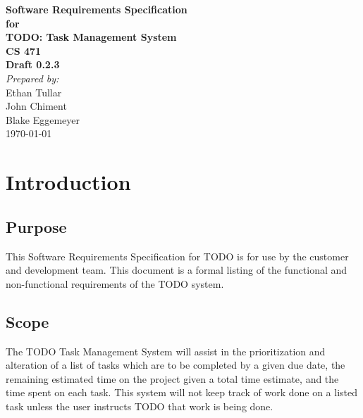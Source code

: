 \documentclass[12pt,a4paper]{article}
\begin{document}
\begin{titlepage}
\begin{flushright} 
{\LARGE \bfseries Software Requirements Specification}\\[1.2cm]
{\large \bfseries for}\\[1.2cm]
{\huge \bfseries TODO: Task Management System}\\[1.2cm]
{\large \bfseries CS 471}\\
\vfill
{\large \bfseries Draft 0.2.3}\\[2cm]
\emph{Prepared by:} \\
Ethan Tullar\\
John Chiment\\
Blake Eggemeyer \\ [3cm]
{\large \today}
\end{flushright}
\end{titlepage}
\setcounter{tocdepth}{3}
\setcounter{secnumdepth}{4}
\tableofcontents
\newpage
\section{Introduction}
\subsection{Purpose}
This Software Requirements Specification for TODO is for use by the customer and development team. This document is a formal listing of the functional and non-functional requirements of the TODO system.
\subsection{Scope}
The TODO Task Management System will assist in the prioritization and alteration of a list of tasks which are to be completed by a given due date, the remaining estimated time on the project given a total time estimate, and the time spent on each task. This system will not keep track of work done on a listed task unless the user instructs TODO that work is being done.
\end{document}
